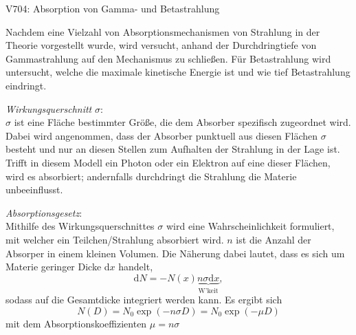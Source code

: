 


    


    \begin{Versuch}{V704: Absorption von Gamma- und Betastrahlung}
    
	\begin{Zielsetzung}
		Nachdem eine Vielzahl von Absorptionsmechanismen von Strahlung in der Theorie vorgestellt wurde, wird versucht, anhand der Durchdringtiefe von Gammastrahlung auf den Mechanismus zu schließen.
		Für Betastrahlung wird untersucht, welche die maximale kinetische Energie ist und wie tief Betastrahlung eindringt.
	\end{Zielsetzung}

        \begin{Theorie}
            \emph{Wirkungsquerschnitt} $\sigma$:\\
            $\sigma$ ist eine Fläche bestimmter Größe, die dem Absorber spezifisch zugeordnet wird.
			Dabei wird angenommen, dass der Absorber punktuell aus diesen Flächen $\sigma$ besteht
			und nur an diesen Stellen zum Aufhalten der Strahlung in der Lage ist. 
			Trifft in diesem Modell ein Photon oder ein Elektron auf eine dieser Flächen, wird es absorbiert; 
			andernfalls durchdringt die Strahlung die Materie unbeeinflusst.

			\emph{Absorptionsgesetz}:\\
			Mithilfe des Wirkungsquerschnittes $\sigma$ wird eine Wahrscheinlichkeit formuliert, mit welcher ein Teilchen/Strahlung absorbiert wird.
			$n$ ist die Anzahl der Absorper in einem kleinen Volumen.
			Die Näherung dabei lautet, dass es sich um Materie geringer Dicke d$x$ handelt, 
			\begin{equation}
				\mathup{d}N=-N(x)  \underbrace{n \sigma \mathup{d}x}_{\text{W'keit}},
				\label{eq:Absorptionsgesetz_Vorstufe}
			\end{equation}
			sodass auf die Gesamtdicke integriert werden kann.
			Es ergibt sich
			\begin{equation}
				N(D)=N_0 \exp(-n \sigma D)=N_0 \exp(-\mu D)
				\label{eq:Absorptionsgesetz}
			\end{equation}
			mit dem Absorptionskoeffizienten $\mu = n\sigma$


\end{Theorie}
\end{Versuch}
